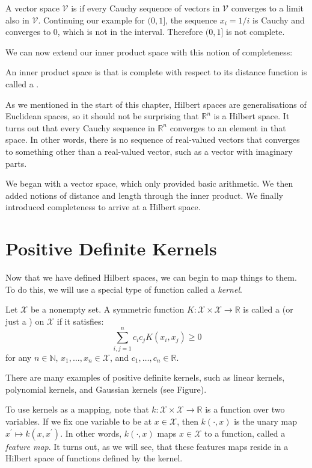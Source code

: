 A vector space $\mathcal{V}$ is  if every Cauchy sequence of vectors in $\mathcal{V}$ converges to a limit also in $\mathcal{V}$. Continuing our example for $(0, 1]$, the sequence $x_i = 1 / i$ is Cauchy and converges to $0$, which is not in the interval. Therefore $(0, 1]$ is not complete.

We can now extend our inner product space with this notion of completeness:
%
\begin{definition}
An inner product space is that is complete with respect to its distance function is called a .
\end{definition}

As we mentioned in the start of this chapter, Hilbert spaces are generalisations of Euclidean spaces, so it should not be surprising that $\mathbb{R}^n$ is a Hilbert space. It turns out that every Cauchy sequence in $\mathbb{R}^n$ converges to an element in that space. In other words, there is no sequence of real-valued vectors that converges to something other than a real-valued vector, such as a vector with imaginary parts.

We began with a vector space, which only provided basic arithmetic. We then added notions of distance and length through the inner product. We finally introduced completeness to arrive at a Hilbert space.

\section{Positive Definite Kernels}
Now that we have defined Hilbert spaces, we can begin to map things to them. To do this, we will use a special type of function called a \emph{kernel}.
%
\begin{definition}
Let $\mathcal{X}$ be a nonempty set. A symmetric function $K : \mathcal{X} \times \mathcal{X} \to \mathbb{R}$ is called a  (or just a ) on $\mathcal{X}$ if it satisfies:
\begin{equation}
	\sum_{i,j=1}^n c_i c_j K(x_i, x_j) \geq 0
\end{equation}
for any $n \in \mathbb{N}$, $x_1, \dots, x_n \in \mathcal{X}$, and $c_1, \dots, c_n \in \mathbb{R}$.
\end{definition}
%
There are many examples of positive definite kernels, such as linear kernels, polynomial kernels, and Gaussian kernels (see Figure).

To use kernels as a mapping, note that $k : \mathcal{X} \times \mathcal{X} \to \mathbb{R}$ is a function over two variables. If we fix one variable to be at $x \in \mathcal{X}$, then $k(\cdot, x)$ is the unary map $x^\prime \mapsto k(x, x^\prime)$. In other words, $k(\cdot, x)$ maps $x \in \mathcal{X}$ to a function, called a \emph{feature map}. It turns out, as we will see, that these features maps reside in a Hilbert space of functions defined by the kernel.

